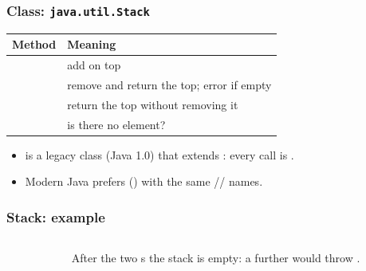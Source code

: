 \documentclass[aspectratio=169,10pt,compress]{beamer}
\begin{document}
\begin{frame}[t,fragile] \frametitle{Class: \texttt{java.util.Stack}}
  \begin{center}\small
  \begin{tabular}{lL{0.55\textwidth}}
    \toprule
    \textbf{Method} & \textbf{Meaning} \\
    \midrule
       & add on top \\
              & remove and return the top; error if empty \\
             & return the top without removing it \\
          & is there no element? \\
    \bottomrule
  \end{tabular}
  \end{center}
  \vspace{0.3em}
  \begin{itemize}\small
    \item {} is a legacy class (Java 1.0) that extends
          : every call is .
    \item Modern Java prefers  ()
          with the same // names.
  \end{itemize}
\end{frame}




\begin{frame}[t,fragile] \frametitle{Stack: example}
  \begin{columns}[T]
    \begin{column}{0.52\textwidth}
    \end{column}
    \begin{column}{0.44\textwidth}
      \small After the two s the stack is empty: a further
       would throw .
    \end{column}
  \end{columns}
\end{frame}
\end{document}
